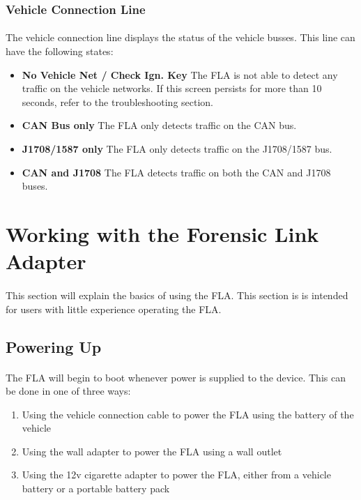 \documentclass[11pt, oneside]{book}
\begin{document}
\subsubsection{Vehicle Connection Line}
\paragraph{  }
The vehicle connection line displays the status of the vehicle busses.
This line can have the following states:
\begin{itemize}
\item \textbf{No Vehicle Net / Check Ign. Key} The FLA is not able to detect
any traffic on the vehicle networks. If this screen persists for more
than 10 seconds, refer to the troubleshooting section.
\item \textbf{CAN Bus only} The FLA only detects traffic on the CAN bus.
\item \textbf{J1708/1587 only} The FLA only detects traffic on the J1708/1587
bus.
\item \textbf{CAN and J1708} The FLA detects traffic on both the CAN and J1708
buses.
\end{itemize}


\section{Working with the Forensic Link Adapter}
\paragraph{  }
This section will explain the basics of using the FLA. This section is is intended for users with little experience operating the FLA.


\subsection{Powering Up}
\paragraph{  }
The FLA will begin to boot whenever power is supplied to the device. This can be done in one of three ways:
\begin{enumerate}
\item Using the vehicle connection cable to power the FLA using the battery
of the vehicle
\item Using the wall adapter to power the FLA using a wall outlet
\item Using the 12v cigarette adapter to power the FLA, either from a vehicle
battery or a portable battery pack
\end{enumerate}
\end{document}
